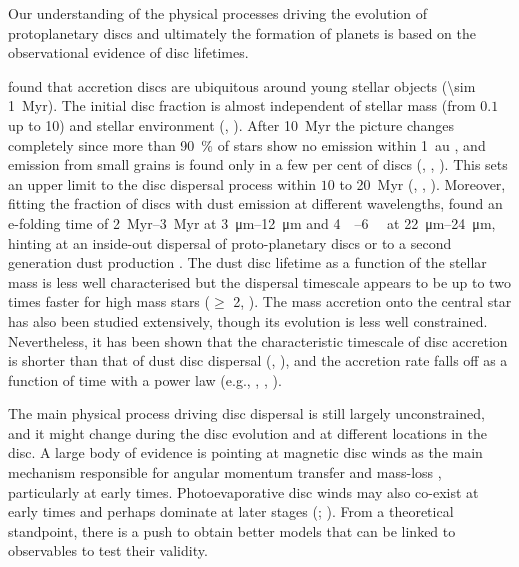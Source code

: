 \documentclass[usenatbib,useAMS,usedcolumn]{mnras}
\begin{document}
Our understanding of the physical processes driving the evolution of protoplanetary discs and ultimately the formation of planets is based on the observational evidence of disc lifetimes.

 found that accretion discs are ubiquitous around young stellar objects (\SI{\sim 1}{Myr}). The initial disc fraction is almost independent of stellar mass (from $0.1$ up to \SI{10}{\solarmass}) and stellar environment (, ).
After \SI{10}{Myr} the picture changes completely since more than \SI{90}{\percent} of stars show no emission within \SI{1}{\astronomicalunit} , and emission from small grains is found only in a few per cent of discs (, , ).
This sets an upper limit to the disc dispersal process within $10$ to \SI{20}{Myr} (, , ). Moreover, fitting the fraction of discs with dust emission at different wavelengths,  found an e-folding time of \SIrange{2}{3}{Myr} at \SIrange[]{3}{12}{\micro\meter} and \SIrange[]{4}{6}{\mega\year} at \SIrange[]{22}{24}{\micro\meter}, hinting at an inside-out dispersal of proto-planetary discs or to a second generation dust production .
The dust disc lifetime as a function of the stellar mass is less well characterised but the dispersal timescale appears to be up to two times faster for high mass stars ($\geq$ \SI{2}{\solarmass}, ).
The mass accretion onto the central star has also been studied extensively, though its evolution is less well constrained. Nevertheless, it has been shown that the characteristic timescale of disc accretion is shorter than that of dust disc dispersal (, ), and the accretion rate falls off as a function of time with a power law (e.g., , , ).

The main physical process driving disc dispersal is still largely unconstrained, and it might change during the disc evolution and at different locations in the disc. A large body of evidence is pointing at magnetic disc winds as the main mechanism responsible for angular momentum transfer and mass-loss , particularly at early times. Photoevaporative disc winds may also co-exist at early times and perhaps dominate at later stages (; ). From a theoretical standpoint, there is a push to obtain better models that can be linked to observables to test their validity.
\end{document}
